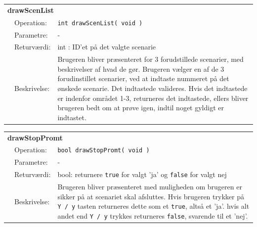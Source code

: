 \begin{table}[h]
\begin{tabularx}{\textwidth}{p{0.6 cm} l X} %
\multicolumn{3}{l}{\textbf{drawScenList}}\\
& Operation: & 
\texttt{int drawScenList( void )} 
\\ & Parametre: & 
 -
\\ & Returværdi: & 
int : ID'et på det valgte scenarie
\\ & Beskrivelse: &
Brugeren bliver præsenteret for 3 forudstillede scenarier, med beskrivelser af hvad de gør. Brugeren vælger en af de 3 forudinstillet scenarier, ved at indtaste nummeret på det ønskede scenarie. Det indtastede valideres. Hvis det indtastede er indenfor området 1-3, returneres det indtastede, ellers bliver brugeren bedt om at prøve igen, indtil noget gyldigt er indtastet.
\end{tabularx}
\end{table}

\clearpage

\begin{table}[h]
	\begin{tabularx}{\textwidth}{p{0.6 cm} l X} %
	\multicolumn{3}{l}{\textbf{drawStopPromt}}\\
	& Operation: & 
	\texttt{bool drawStopPromt( void )} 
	\\ & Parametre: & 
	 -
	\\ & Returværdi: & 
	bool: returnere \texttt{true} for valgt 'ja' og \texttt{false} for valgt nej
	\\ & Beskrivelse: & 
	Brugeren bliver præsenteret med muligheden om brugeren er sikker på at scenariet skal afsluttes. Hvis brugeren trykker på \texttt{Y / y} tasten returneres dette som et \texttt{true}, altså et 'ja'. hvis alt andet end \texttt{Y / y} trykkes returneres \texttt{false}, svarende til et 'nej'.
\end{tabularx}
\end{table}

\clearpage
